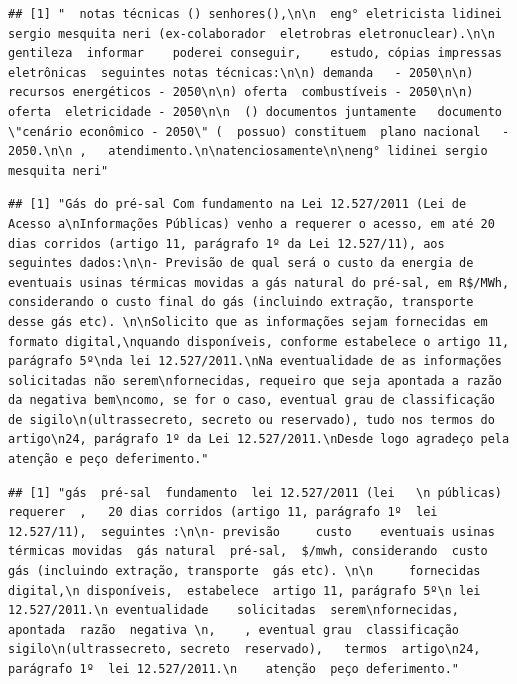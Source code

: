 \documentclass[]{article}
\newenvironment{Shaded}{\begin{snugshade}}{\end{snugshade}}
\newcommand{\CommentTok}[1]{\textcolor[rgb]{0.56,0.35,0.01}{\textit{#1}}}
\newcommand{\DecValTok}[1]{\textcolor[rgb]{0.00,0.00,0.81}{#1}}
\newcommand{\NormalTok}[1]{#1}
\newcommand{\OperatorTok}[1]{\textcolor[rgb]{0.81,0.36,0.00}{\textbf{#1}}}
\begin{document}
\begin{verbatim}
## [1] "  notas técnicas () senhores(),\n\n  eng° eletricista lidinei sergio mesquita neri (ex-colaborador  eletrobras eletronuclear).\n\n  gentileza  informar    poderei conseguir,    estudo, cópias impressas  eletrônicas  seguintes notas técnicas:\n\n) demanda   - 2050\n\n) recursos energéticos - 2050\n\n) oferta  combustíveis - 2050\n\n) oferta  eletricidade - 2050\n\n  () documentos juntamente   documento \"cenário econômico - 2050\" (  possuo) constituem  plano nacional   - 2050.\n\n ,   atendimento.\n\natenciosamente\n\neng° lidinei sergio mesquita neri"
\end{verbatim}

\begin{Shaded}
\end{Shaded}

\begin{verbatim}
## [1] "Gás do pré-sal Com fundamento na Lei 12.527/2011 (Lei de Acesso a\nInformações Públicas) venho a requerer o acesso, em até 20 dias corridos (artigo 11, parágrafo 1º da Lei 12.527/11), aos seguintes dados:\n\n- Previsão de qual será o custo da energia de eventuais usinas térmicas movidas a gás natural do pré-sal, em R$/MWh, considerando o custo final do gás (incluindo extração, transporte desse gás etc). \n\nSolicito que as informações sejam fornecidas em formato digital,\nquando disponíveis, conforme estabelece o artigo 11, parágrafo 5º\nda lei 12.527/2011.\nNa eventualidade de as informações solicitadas não serem\nfornecidas, requeiro que seja apontada a razão da negativa bem\ncomo, se for o caso, eventual grau de classificação de sigilo\n(ultrassecreto, secreto ou reservado), tudo nos termos do artigo\n24, parágrafo 1º da Lei 12.527/2011.\nDesde logo agradeço pela atenção e peço deferimento."
\end{verbatim}

\begin{Shaded}
\end{Shaded}

\begin{verbatim}
## [1] "gás  pré-sal  fundamento  lei 12.527/2011 (lei   \n públicas)   requerer  ,   20 dias corridos (artigo 11, parágrafo 1º  lei 12.527/11),  seguintes :\n\n- previsão     custo    eventuais usinas térmicas movidas  gás natural  pré-sal,  $/mwh, considerando  custo   gás (incluindo extração, transporte  gás etc). \n\n     fornecidas   digital,\n disponíveis,  estabelece  artigo 11, parágrafo 5º\n lei 12.527/2011.\n eventualidade    solicitadas  serem\nfornecidas,    apontada  razão  negativa \n,    , eventual grau  classificação  sigilo\n(ultrassecreto, secreto  reservado),   termos  artigo\n24, parágrafo 1º  lei 12.527/2011.\n    atenção  peço deferimento."
\end{verbatim}
\end{document}
